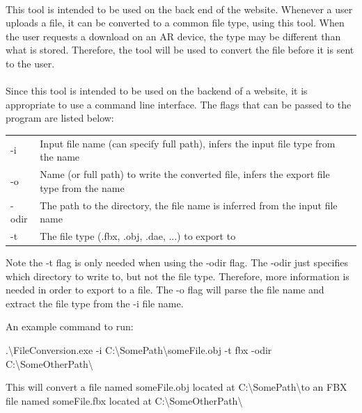     \paragraph{}
    This tool is intended to be used on the back end of the website.  Whenever a user uploads a file, it can be converted to a common file type, using this tool.
    When the user requests a download on an AR device, the type may be different than what is stored.  Therefore, the tool will be used to convert the file before
    it is sent to the user.

    \paragraph{}
    Since this tool is intended to be used on the backend of a website, it is appropriate to use a command line interface.  
    The flags that can be passed to the program are listed below:

    \begin{table}[h]
        \centering
        \begin{tabular}{l  l}
            -i & Input file name (can specify full path), infers the input file type from the name \\
            -o & Name (or full path) to write the converted file, infers the export file type from the name \\
            -odir & The path to the directory, the file name is inferred from the input file name \\
            -t & The file type (.fbx, .obj, .dae, ...) to export to
        \end{tabular}
    \end{table}

    Note the -t flag is only needed when using the -odir flag.  The -odir just specifies which directory to write to, but not the file type.
    Therefore, more information is needed in order to export to a file.  The -o flag will parse the file name and extract the file type from the -i file name.

    An example command to run:

    \begin{center}
        .\textbackslash FileConversion.exe -i C:\textbackslash SomePath\textbackslash someFile.obj -t fbx -odir C:\textbackslash SomeOtherPath\textbackslash
    \end{center}

    This will convert a file named someFile.obj located at C:\textbackslash SomePath\textbackslash  to an FBX file named someFile.fbx located at 
    C:\textbackslash SomeOtherPath\textbackslash


